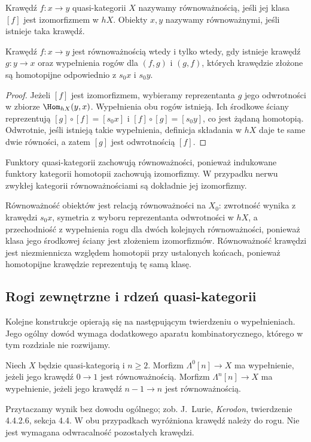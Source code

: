 \begin{definicja}\label{cat:def:quasicat-equivalence}
Krawędź $f:x\to y$ quasi-kategorii $X$ nazywamy równoważnością, jeśli jej klasa $[f]$ jest izomorfizmem w $hX$. Obiekty $x,y$ nazywamy równoważnymi, jeśli istnieje taka krawędź.
\end{definicja}

\begin{stwierdzenie}\label{cat:prop:quasicat-equivalence-inverse}
Krawędź $f:x\to y$ jest równoważnością wtedy i tylko wtedy, gdy istnieje krawędź $g:y\to x$ oraz wypełnienia rogów dla $(f,g)$ i $(g,f)$, których krawędzie złożone są homotopijne odpowiednio z $s_0x$ i $s_0y$.
\end{stwierdzenie}
\begin{proof}
Jeżeli $[f]$ jest izomorfizmem, wybieramy reprezentanta $g$ jego odwrotności w zbiorze $\Hom_{hX}(y,x)$. Wypełnienia obu rogów istnieją. Ich środkowe ściany reprezentują $[g]\circ[f]=[s_0x]$ i $[f]\circ[g]=[s_0y]$, co jest żądaną homotopią. Odwrotnie, jeśli istnieją takie wypełnienia, definicja składania w $hX$ daje te same dwie równości, a zatem $[g]$ jest odwrotnością $[f]$.
\end{proof}
Funktory quasi-kategorii zachowują równoważności, ponieważ indukowane funktory kategorii homotopii zachowują izomorfizmy. W przypadku nerwu zwykłej kategorii równoważnościami są dokładnie jej izomorfizmy.

Równoważność obiektów jest relacją równoważności na $X_0$: zwrotność wynika z krawędzi $s_0x$, symetria z wyboru reprezentanta odwrotności w $hX$, a przechodniość z wypełnienia rogu dla dwóch kolejnych równoważności, ponieważ klasa jego środkowej ściany jest złożeniem izomorfizmów. Równoważność krawędzi jest niezmiennicza względem homotopii przy ustalonych końcach, ponieważ homotopijne krawędzie reprezentują tę samą klasę.


\subsection{Rogi zewnętrzne i rdzeń quasi-kategorii}

Kolejne konstrukcje opierają się na następującym twierdzeniu o wypełnieniach. Jego ogólny dowód wymaga dodatkowego aparatu kombinatorycznego, którego w tym rozdziale nie rozwijamy.

\begin{twierdzenie}\label{cat:thm:equivalence-outer-horn}
Niech $X$ będzie quasi-kategorią i $n\geq2$. Morfizm $\Lambda^0[n]\to X$ ma wypełnienie, jeżeli jego krawędź $0\to1$ jest równoważnością. Morfizm $\Lambda^n[n]\to X$ ma wypełnienie, jeżeli jego krawędź $n-1\to n$ jest równoważnością.
\end{twierdzenie}
Przytaczamy wynik bez dowodu ogólnego; zob. J.~Lurie, \emph{Kerodon}, twierdzenie 4.4.2.6, sekcja 4.4. W obu przypadkach wyróżniona krawędź należy do rogu. Nie jest wymagana odwracalność pozostałych krawędzi.

